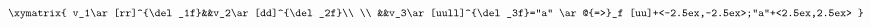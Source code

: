 \begin{equation}
\begin{aligned}
\xymatrix{
  v_1\ar[rr]^{\del_1f}&&v_2\ar[dd]^{\del_2f}\\
  \\
  &&v_3\ar[uull]^{\del_3f}="a"
  \ar@{=>}_f [uu]+<-2.5ex,-2.5ex>;"a"+<2.5ex,2.5ex>
}
\end{aligned}
\end{equation}

